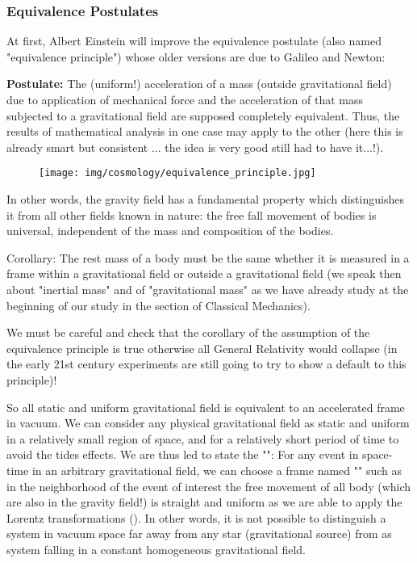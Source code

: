 	\subsubsection{Equivalence Postulates}
	At first, Albert Einstein will improve the equivalence postulate (also named "equivalence principle") whose older versions are due to Galileo and Newton:
	
	\textbf{Postulate:} The (uniform!) acceleration of a mass (outside gravitational field) due to application of mechanical force and the acceleration of that mass subjected to a gravitational field are supposed completely equivalent. Thus, the results of mathematical analysis in one case may apply to the other (here this is already smart but consistent ... the idea is very good still had to have it...!). 
	\begin{figure}[H]
		\begin{center}
		\texttt{[image: img/cosmology/equivalence\_principle.jpg]}
		\end{center}	
	\end{figure}
	In other words, the gravity field has a fundamental property which distinguishes it from all other fields known in nature: the free fall movement of bodies is universal, independent of the mass and composition of the bodies.
	
	Corollary: The rest mass of a body must be the same whether it is measured in a frame within a gravitational field or outside a gravitational field (we speak then about "inertial mass" and of "gravitational mass" as we have already study at the beginning of our study in the section of Classical Mechanics).
	
	\begin{tcolorbox}[title=Remark,colframe=black,arc=10pt]
	We must be careful and check that the corollary of the assumption of the equivalence principle is true otherwise all General Relativity would collapse (in the early 21st century experiments are still going to try to show a default to this principle)!
	\end{tcolorbox}	
	
	So all static and uniform gravitational field is equivalent to an accelerated frame in vacuum. We can consider any physical gravitational field as static and uniform in a relatively small region of space, and for a relatively short period of time to avoid the tides effects. We are thus led to state the "": For any event in space-time in an arbitrary gravitational field, we can choose a frame named "" such as in the neighborhood of the event of interest the free movement of all body (which are also in the gravity field!) is straight and uniform as we are able to apply the Lorentz transformations (). In other words, it is not possible to distinguish a system in vacuum space far away from any star (gravitational source) from as system falling in a constant homogeneous gravitational field.
	
